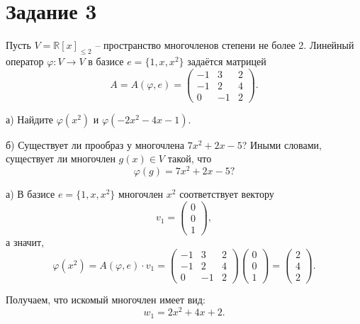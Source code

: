 \documentclass[a4paper,12pt]{article}
\newcommand{\ssolve}{\par\vspace{5pt}\noindent{\bf Решение. }\par}
\begin{document}
\section*{Задание 3}

Пусть $V=\mathbb{R}[x]_{\leqslant 2}$ -- пространство многочленов степени не более 2. 
Линейный оператор $\varphi\colon V\rightarrow V$ в базисе $e = \{1,x,x^2\}$ задаётся матрицей
$$
A = A(\varphi, e) = \begin{pmatrix}
-1&3&2\\
-1&2&4\\
0&-1&2
\end{pmatrix}.
$$

а) Найдите $\varphi(x^2)$ и $\varphi(-2x^2 - 4x - 1)$.

\vspace{3pt}

б) Существует ли прообраз у многочлена $7x^2 + 2x - 5$? Иными словами, существует ли многочлен $g(x) \in V$ такой, что $$\varphi(g) = 7x^2 + 2x - 5?$$

\ssolve
а) В базисе $e = \{1,x,x^2\}$ многочлен $x^2$ соответствует вектору 
$$v_1=
\begin{pmatrix}
0 \\ 0 \\ 1
\end{pmatrix}
,$$
а значит, 		
$$\varphi(x^2)=A(\varphi, e)\cdot v_1 =
\begin{pmatrix}
-1&3&2\\
-1&2&4\\
0&-1&2
\end{pmatrix}
\begin{pmatrix}
0 \\ 0 \\ 1
\end{pmatrix}
=
\begin{pmatrix}
2 \\ 4 \\ 2
\end{pmatrix}
.$$ \par
Получаем, что искомый многочлен имеет вид:
$$w_1 = 2x^2+4x+2.$$
\end{document}
